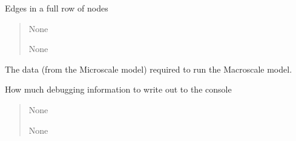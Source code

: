 \documentclass[letterpaper,10pt,english]{sphinxmanual}
\begin{document}
\begin{fulllineitems}
\begin{fulllineitems}
\label{\detokenize{lysis.util:lysis.util.parameters.MacroParameters.full_row}}
\pysigstartsignatures
{}
\pysigstopsignatures
\sphinxAtStartPar
Edges in a full row of nodes
\begin{quote}\begin{description}
\sphinxAtStartPar
None

\sphinxAtStartPar
None

\end{description}\end{quote}

\end{fulllineitems}


\begin{fulllineitems}
\label{\detokenize{lysis.util:lysis.util.parameters.MacroParameters.input_data}}
\pysigstartsignatures
{}
\pysigstopsignatures
\sphinxAtStartPar
The data (from the Microscale model) required to run the Macroscale
model.

\end{fulllineitems}


\begin{fulllineitems}
\label{\detokenize{lysis.util:lysis.util.parameters.MacroParameters.log_lvl}}
\pysigstartsignatures
{}
\pysigstopsignatures
\sphinxAtStartPar
How much debugging information to write out to the console
\begin{quote}\begin{description}
\sphinxAtStartPar
None

\sphinxAtStartPar
None


\end{description}
\end{quote}
\end{fulllineitems}
\end{fulllineitems}
\end{document}
